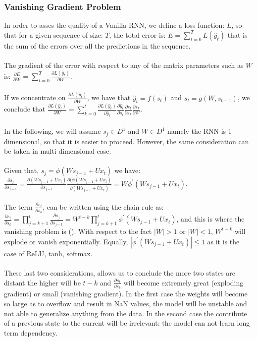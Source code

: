 \documentclass[LaM,binding=0.6cm]{sapthesis}
\begin{document}
\subsubsection{Vanishing Gradient Problem}
In order to asses the quality of a Vanilla RNN, we define a loss function: $L$, so that for a given sequence of size: $T$, the total error is: $E=\sum_{t=0}^{T}L(\hat{y}_t)$ that is the sum of the errors over all the predictions in the sequence.\\\\The gradient of the error with respect to any of the matrix parameters such as $W$ is: $\frac{\partial E}{\partial W}=\sum_{t=0}^{T}\frac{\partial L(\hat{y}_t)}{\partial W}$.\\\\If we concentrate on $\frac{\partial L(\hat{y}_t)}{\partial W}$, we have that $\hat{y}_t=f(s_t)$ and $s_t=g(W,s_{t-1})$, we conclude that $\frac{\partial L(\hat{y}_t)}{\partial W} = \sum_{k=0}^t \frac{\partial L(\hat{y}_t)}{\partial \hat{y}_t} \frac{\partial \hat{y}_t}{\partial {s}_t} \frac{\partial s_t}{\partial {s}_k} \frac{\partial s_k}{\partial W} $.\\\\In the following, we will assume $s_j \in D^1$ and $W \in D^1$ namely the RNN is 1 dimensional, so that it is easier to proceed. However, the same consideration can be taken in multi dimensional case.\\\\Given that, $s_j=\phi(Ws_{j-1}+Ux_t)$ we have:
$\frac{\partial s_j}{\partial s_{j-1}}= \frac{\partial(Ws_{j-1}+Ux_t)}{\partial s_{j-1}} \frac{\partial(\phi(Ws_{j-1}+Ux_t)}{\partial (Ws_{j-1}+Ux_t)} = W \phi^{'}(Ws_{j-1}+Ux_t)$.\\\\The term $\frac{\partial s_t}{\partial {s}_k}$, can be written using the chain rule as: $\frac{\partial s_t}{\partial {s}_k}=\prod_{j=k+1}^{t}\frac{\partial s_j}{\partial s_{j-1}}=W^{t-k}\prod_{j=k+1}^{t}\phi^{'}\left(Ws_{j-1}+Ux_t\right)$, and this is where the vanishing problem is (\cite{vanprob}). With respect to the fact $|W|>1$ or $|W|<1$, $W^{t-k}$ will explode or vanish exponentially. Equally, $\left|\phi^{'}(Ws_{j-1}+Ux_t)\right|\leq1$ as it is the case of ReLU, tanh, softmax.\\\\These last two considerations, allows us to conclude the more two states are distant the higher will be $t-k$ and $\frac{\partial s_t}{\partial {s}_k}$ will become extremely great (exploding gradient) or small (vanishing gradient). In the first case the weights will become so large as to overflow and result in NaN values, the model will be unstable and not able to generalize anything from the data. In the second case the contribute of a previous state to the current will be irrelevant: the model can not learn long term dependency.
\end{document}
